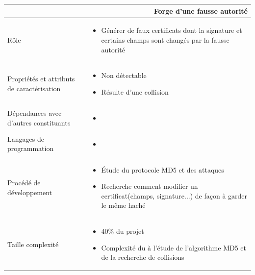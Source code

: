 \documentclass[a4paper,11pt,french]{article}
\begin{document}

\begin{center}
        \vspace*{0.7cm}
        \begin{tabularx}{16cm}{|l|X|}
        \hline
        \multicolumn{2}{|r|}{\textbf{Forge d'une fausse autorité}}\\
        \hline
        R\^ole &  \begin{itemize}\item Générer de faux certificats dont la signature et certains champs sont changés par la fausse autorité  \end{itemize}\\
        \hline
        Propriétés et attributs de caractérisation & \begin{itemize} \item Non détectable \item Résulte d'une collision \end{itemize}\\
        \hline
        Dépendances avec d'autres constituants & \begin{itemize}\item  \end{itemize}\\
        \hline
        Langages de programmation & \begin{itemize} \item  \end{itemize}\\
        \hline
        Procédé de développement & \begin{itemize}\item Étude du protocole MD5 et des attaques \item Recherche comment modifier un certificat(champs, signature...) de façon à garder le même haché \end{itemize}\\
        \hline
        Taille complexité & \begin{itemize}\item 40\% du projet \item Complexité du à l'étude de l'algorithme MD5 et de la recherche de collisions\end{itemize}\\
        \hline
        \end{tabularx}
\end{center}

\vspace{2cm}
\end{document}
